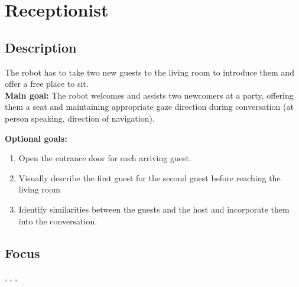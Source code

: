\section{Receptionist}
\label{test:receptionist}
\subsection*{Description}
The robot has to take two new guests to the living room to introduce them and offer a free place to sit.\\
    
\textbf{Main goal:}
    The robot welcomes and assists two newcomers at a party, offering them a seat and maintaining appropriate gaze direction during conversation (at person speaking, direction of navigation).

\textbf{Optional goals:}
\begin{enumerate}[nosep]
	\item Open the entrance door for each arriving guest.
	\item Visually describe the first guest for the second guest before reaching the living room
	\item Identify similarities between the guests and the host and incorporate them into the conversation.
\end{enumerate}

\subsection*{Focus}
\SysI{}, \HRI{}, \PerDet{}, \PerRec{}

